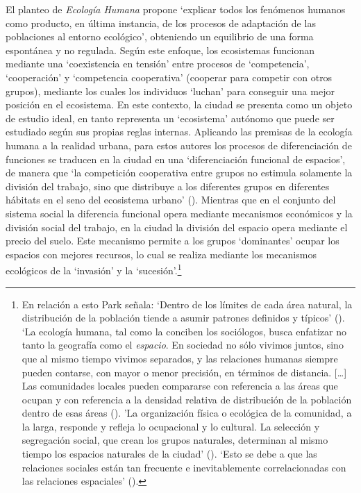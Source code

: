 \documentclass[
  spanish,
  a4paper,%
  chapterprefix=true,%
  DIV=calc,%
  twoside]{scrbook}%
\begin{document}
El planteo de \emph{Ecología Humana} propone `explicar todos los fenómenos
humanos como producto, en última instancia, de los procesos de
adaptación de las poblaciones al entorno ecológico', obteniendo un
equilibrio de una forma espontánea y no regulada. Según este enfoque,
los ecosistemas funcionan mediante una `coexistencia en tensión' entre
procesos de `competencia', `cooperación' y `competencia cooperativa'
(cooperar para competir con otros grupos), mediante los cuales los
individuos `luchan' para conseguir una mejor posición en el ecosistema.
En este contexto, la ciudad se presenta como un objeto de estudio ideal,
en tanto representa un `ecosistema' autónomo que puede ser estudiado
según sus propias reglas internas. Aplicando las premisas de la ecología
humana a la realidad urbana, para estos autores los procesos de
diferenciación de funciones se traducen en la ciudad en una
`diferenciación funcional de espacios', de manera que `la competición
cooperativa entre grupos no estimula solamente la división del trabajo,
sino que distribuye a los diferentes grupos en diferentes hábitats en el
seno del ecosistema urbano' (). Mientras que en
el conjunto del sistema social la diferencia funcional opera mediante
mecanismos económicos y la división social del trabajo, en la ciudad la
división del espacio opera mediante el precio del suelo. Este mecanismo
permite a los grupos `dominantes' ocupar los espacios con mejores
recursos, lo cual se realiza mediante los mecanismos ecológicos de la
`invasión' y la `sucesión'.\footnote{En relación a esto Park señala: `Dentro de los
  límites de cada área natural, la distribución de la población tiende
  a asumir patrones definidos y típicos' (). `La
  ecología humana, tal como la conciben los sociólogos, busca
  enfatizar no tanto la geografía como el \emph{espacio}. En sociedad no
  sólo vivimos juntos, sino que al mismo tiempo vivimos separados, y
  las relaciones humanas siempre pueden contarse, con mayor o menor
  precisión, en términos de distancia. {[}\ldots{]} Las comunidades locales
  pueden compararse con referencia a las áreas que ocupan y con
  referencia a la densidad relativa de distribución de la población
  dentro de esas áreas (). 'La organización física o
  ecológica de la comunidad, a la larga, responde y refleja lo
  ocupacional y lo cultural. La selección y segregación social, que
  crean los grupos naturales, determinan al mismo tiempo los espacios
  naturales de la ciudad' (). `Esto se debe a que las
  relaciones sociales están tan frecuente e inevitablemente
  correlacionadas con las relaciones espaciales' ().}
\end{document}
